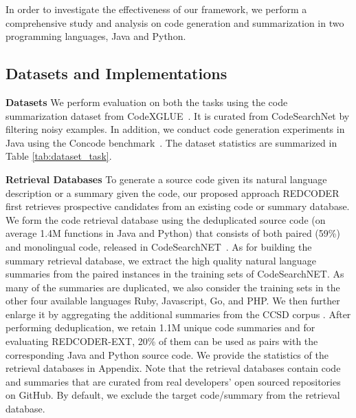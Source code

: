 \documentclass[11pt]{article}
\newcommand{\tool}{{REDCODER}\xspace}
\newcommand{\toolext}{{REDCODER-EXT}\xspace}
\begin{document}
 


In order to investigate the effectiveness of our framework, we perform a comprehensive study and analysis on code generation and summarization in two programming languages, Java and Python.  


\subsection{Datasets and Implementations}

\noindent\textbf{Datasets\hspace{0.5em}} 
We perform evaluation on both the tasks using the code summarization dataset from CodeXGLUE~\cite{CodeXGLUE}.
It is curated from  CodeSearchNet \cite{husain2019codesearchnet} by filtering noisy examples.
In addition, we conduct code generation experiments in Java using the Concode benchmark~\cite{iyer-etal-2018-mapping}.
The dataset statistics are summarized in Table \ref{tab:dataset_task}. 


\smallskip\noindent\textbf{Retrieval Databases\hspace{0.5em}} 
To generate a source code given its natural language description or a summary given the code, our proposed approach \tool first retrieves prospective candidates from an existing code or summary database. 
We form the code retrieval database using the deduplicated source code (on average 1.4M functions in Java and Python) that consists of both paired (59\%) and monolingual code, released in CodeSearchNET~\cite{husain2019codesearchnet}. As for building the summary retrieval database, we extract the high quality natural language summaries from the paired instances in the training sets  of CodeSearchNET. As many of the summaries are duplicated, we also consider the training sets in the other four available languages Ruby, Javascript, Go, and PHP. We then further enlarge it by aggregating the additional summaries from the CCSD corpus \cite{liu2021retrievalaugmented}.
After performing deduplication, we retain 1.1M unique code summaries and for evaluating \toolext, 20\% of them can be used as pairs with the corresponding Java and Python source code. We provide the statistics of the retrieval databases in Appendix.
Note that the retrieval databases contain code and summaries that are curated from real developers' open sourced repositories on GitHub. 
By default, we exclude the target code/summary from the retrieval database. 
\end{document}
